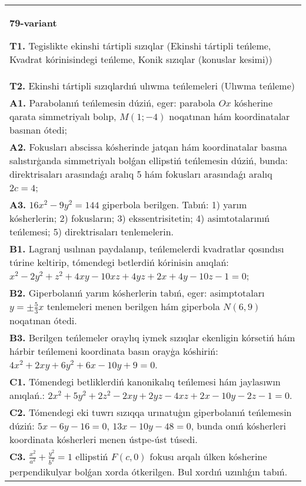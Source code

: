 \documentclass{article}
\begin{document}
\begin{tabular}{m{17cm}}
\textbf{79-variant}
\newline

\textbf{T1.} Tegislikte ekinshi tártipli sızıqlar (Ekinshi tártipli teńleme, Kvadrat kórinisindegi teńleme, Konik sızıqlar (konuslar kesimi)) \\
\textbf{T2.} Ekinshi tártipli sızıqlardıń ulıwma teńlemeleri (Ulıwma teńleme) \\
\textbf{A1.} Parabolanıń teńlemesin dúziń, eger: parabola $O x$ kósherine qarata simmetriyalı bolıp, $M (1;-4) $ noqatınan hám koordinatalar basınan ótedi; \\
\textbf{A2.} Fokusları abscissa kósherinde jatqan hám koordinatalar basına salıstırģanda simmetriyalı bolǵan ellipstiń teńlemesin dúziń, bunda: direktrisaları arasındaǵı aralıq 5 hám fokusları arasındaǵı aralıq $2c=4$; \\
\textbf{A3.} $16 x^2-9 y^2=144$ giperbola berilgen. Tabıń: 1) yarım kósherlerin; 2) fokusların; 3) ekssentrisitetin; 4) asimtotalarınıń teńlemesi; 5) direktrisaları tenlemelerin. \\
\textbf{B1.} Lagranj usılınan paydalanıp, teńlemelerdi kvadratlar qosındısı túrine keltirip, tómendegi betlerdiń kórinisin anıqlań: $x^2-2 y^2+z^2+4 x y-10 x z+4 y z+2 x+4 y-10 z-1=0$; \\
\textbf{B2.} Giperbolanıń yarım kósherlerin tabıń, eger: asimptotaları $y= \pm \frac{5}{3} x$ tenlemeleri menen berilgen hám giperbola $N (6,9) $ noqatınan ótedi. \\
\textbf{B3.} Berilgen teńlemeler oraylıq iymek sızıqlar ekenligin kórsetiń hám hárbir teńlemeni koordinata basın orayģa kóshiriń:  $4 x^2+2 x y+6 y^2+6 x-10 y+9=0$. \\
\textbf{C1.} Tómendegi betliklerdiń kanonikalıq teńlemesi hám jaylasıwın anıqlań.: $2 x^2+5 y^2+2 z^2-2 x y+2 y z-4 x z+2 x-10 y-2 z-1=0$. \\
\textbf{C2.} Tómendegi eki tuwrı sızıqqa urınatuģın giperbolanıń teńlemesin dúziń: $5x-6y-16=0$, $13x-10y-48=0$, bunda onıń kósherleri koordinata kósherleri menen ústpe-úst túsedi. \\
\textbf{C3.} $\frac{x^2}{a^2}+\frac{y^2}{b^2}=1$ ellipstiń $F(c, 0)$ fokusı arqalı úlken kósherine perpendikulyar bolǵan xorda ótkerilgen. Bul xordıń uzınlıǵın tabıń. \\

\end{tabular}
\vspace{1cm}
\end{document}
